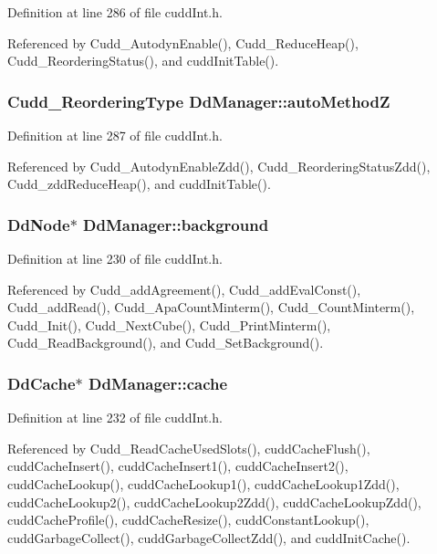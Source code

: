 Definition at line 286 of file cudd\-Int.h.

Referenced by Cudd\_\-Autodyn\-Enable(), Cudd\_\-Reduce\-Heap(), Cudd\_\-Reordering\-Status(), and cudd\-Init\-Table().
\subsubsection{\setlength{\rightskip}{0pt plus 5cm}\bf{Cudd\_\-Reordering\-Type} \bf{Dd\-Manager::auto\-Method\-Z}}\label{structDdManager_988678149a1dc49fe41c29846575a056}




Definition at line 287 of file cudd\-Int.h.

Referenced by Cudd\_\-Autodyn\-Enable\-Zdd(), Cudd\_\-Reordering\-Status\-Zdd(), Cudd\_\-zdd\-Reduce\-Heap(), and cudd\-Init\-Table().
\subsubsection{\setlength{\rightskip}{0pt plus 5cm}\bf{Dd\-Node}$\ast$ \bf{Dd\-Manager::background}}\label{structDdManager_f901aff58575a7fea75f7de35b4684b6}




Definition at line 230 of file cudd\-Int.h.

Referenced by Cudd\_\-add\-Agreement(), Cudd\_\-add\-Eval\-Const(), Cudd\_\-add\-Read(), Cudd\_\-Apa\-Count\-Minterm(), Cudd\_\-Count\-Minterm(), Cudd\_\-Init(), Cudd\_\-Next\-Cube(), Cudd\_\-Print\-Minterm(), Cudd\_\-Read\-Background(), and Cudd\_\-Set\-Background().
\subsubsection{\setlength{\rightskip}{0pt plus 5cm}\bf{Dd\-Cache}$\ast$ \bf{Dd\-Manager::cache}}\label{structDdManager_55ea24f236cafa32a8582782f8ddfa9e}




Definition at line 232 of file cudd\-Int.h.

Referenced by Cudd\_\-Read\-Cache\-Used\-Slots(), cudd\-Cache\-Flush(), cudd\-Cache\-Insert(), cudd\-Cache\-Insert1(), cudd\-Cache\-Insert2(), cudd\-Cache\-Lookup(), cudd\-Cache\-Lookup1(), cudd\-Cache\-Lookup1Zdd(), cudd\-Cache\-Lookup2(), cudd\-Cache\-Lookup2Zdd(), cudd\-Cache\-Lookup\-Zdd(), cudd\-Cache\-Profile(), cudd\-Cache\-Resize(), cudd\-Constant\-Lookup(), cudd\-Garbage\-Collect(), cudd\-Garbage\-Collect\-Zdd(), and cudd\-Init\-Cache().
